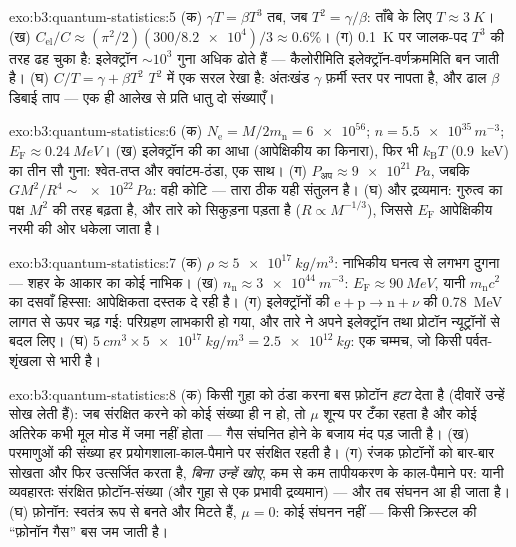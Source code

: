 \begin{solution}{exo:b3:quantum-statistics:5}
(क) $\gamma T = \beta T^3$ तब, जब $T^2 = \gamma/\beta$: ताँबे के लिए
$T \approx \qty{3}{K}$। (ख) $C_{\text{el}}/C \approx
(\pi^2/2)(300/\num{8.2e4})/3 \approx 0.6\%$। (ग) \qty{0.1}{K} पर
जालक-पद $T^3$ की तरह ढह चुका है: इलेक्ट्रॉन
$\sim10^3$ गुना अधिक ढोते हैं --- कैलोरीमिति इलेक्ट्रॉन-वर्णक्रममिति
बन जाती है। (घ) $C/T = \gamma + \beta T^2$
$T^2$ में एक सरल रेखा है: अंतःखंड $\gamma$ फ़र्मी स्तर पर  नापता है, और
ढाल $\beta$ डिबाई ताप --- एक ही आलेख से प्रति धातु दो संख्याएँ।
\end{solution}

\begin{solution}{exo:b3:quantum-statistics:6}
(क) $N_{\text{e}} = M/2m_{\text{n}} = \num{6e56}$; $n =
\num{5.5e35}\,\unit{m^{-3}}$; $E_{\text{F}} \approx
\qty{0.24}{MeV}$। (ख) इलेक्ट्रॉन की  का आधा (आपेक्षिकीय
का किनारा), फिर भी $k_{\text{B}}T$
(\qty{0.9}{keV}) का तीन सौ गुना: श्वेत-तप्त और क्वांटम-ठंडा, एक
साथ। (ग)
$P_{\text{अप}} \approx \qty{9e21}{Pa}$, जबकि $GM^2/R^4 \sim
\num{e22}\,\unit{Pa}$: वही कोटि --- तारा ठीक यही
संतुलन है। (घ) और द्रव्यमान: गुरुत्व का पक्ष $M^2$ की तरह बढ़ता है,
और तारे को सिकुड़ना पड़ता है ($R \propto M^{-1/3}$), जिससे $E_{\text{F}}$
आपेक्षिकीय नरमी की ओर धकेला जाता है।
\end{solution}

\begin{solution}{exo:b3:quantum-statistics:7}
(क) $\rho \approx \qty{5e17}{kg/m^3}$: नाभिकीय घनत्व से लगभग
दुगना --- शहर के आकार का कोई नाभिक। (ख) $n_{\text{n}}
\approx \qty{3e44}{m^{-3}}$: $E_{\text{F}} \approx \qty{90}{MeV}$,
यानी $m_{\text{n}}c^2$ का दसवाँ हिस्सा: आपेक्षिकता दस्तक दे रही
है। (ग) इलेक्ट्रॉनों की 
$\text{e} + \text{p} \to \text{n} + \nu$ की \qty{0.78}{MeV} लागत
से ऊपर चढ़ गई: परिग्रहण लाभकारी हो गया, और तारे ने अपने
इलेक्ट्रॉन तथा प्रोटॉन न्यूट्रॉनों से बदल लिए। (घ)
$\qty{5}{cm^3} \times \qty{5e17}{kg/m^3} =
\qty{2.5e12}{kg}$: एक चम्मच, जो किसी पर्वत-शृंखला से भारी है।
\end{solution}

\begin{solution}{exo:b3:quantum-statistics:8}
(क) किसी गुहा को ठंडा करना बस फ़ोटॉन \emph{हटा} देता है (दीवारें
उन्हें सोख लेती हैं): जब संरक्षित करने को कोई संख्या ही न हो, तो
$\mu$ शून्य पर टँका रहता है और कोई अतिरेक कभी मूल मोड में जमा नहीं
होता --- गैस संघनित होने के बजाय मंद पड़ जाती है। (ख) परमाणुओं की
संख्या हर प्रयोगशाला-काल-पैमाने पर संरक्षित रहती है। (ग) रंजक
फ़ोटॉनों को बार-बार सोखता और फिर उत्सर्जित करता है, \emph{बिना
उन्हें खोए}, कम से कम तापीयकरण के काल-पैमाने पर: यानी व्यवहारतः
संरक्षित फ़ोटॉन-संख्या (और गुहा से एक प्रभावी द्रव्यमान) --- और तब
संघनन आ ही जाता है।
(घ) फ़ोनॉन: स्वतंत्र रूप से बनते और मिटते हैं, $\mu = 0$: कोई
संघनन नहीं --- किसी क्रिस्टल की ``फ़ोनॉन गैस'' बस जम जाती है।
\end{solution}

